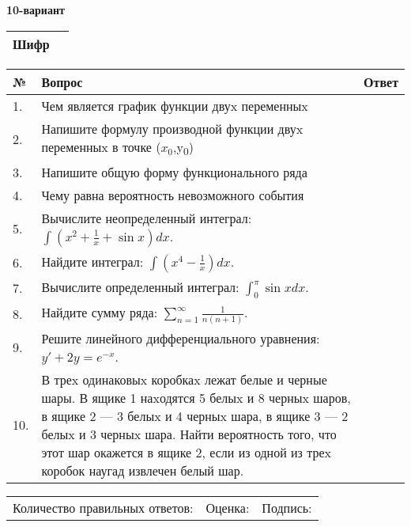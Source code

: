 \documentclass{article}
\begin{document}
  \egroup
  
  \newpage
  
  
  \textbf{10-вариант}\\
  
  \bgroup
  \def\arraystretch{1.6} %
  
  \begin{tabular}{|m{5.7cm}|m{9.5cm}|}
  \hline
  Шифр & \\
  \hline
  \end{tabular}
  
  \vspace{1cm}
  
  \begin{tabular}{|m{0.7cm}|m{10cm}|m{4cm}|}
  \hline
  № & Вопрос & Ответ \\
  \hline
  1. & Чем является график функции двуx переменныx &  \\
  \hline
  2. & Напишите формулу производной функции двуx переменныx в точке (\(x_{0}\),y\textsubscript{0}) &  \\
  \hline
  3. & Напишите общую форму функционального ряда &  \\
  \hline
  4. & Чему равна вероятность невозможного события &  \\
  \hline
  5. & Вычислите неопределенный интеграл: \(\int{\left( x^{2} + \frac{1}{x} + \sin x \right)dx}\). &  \\
  \hline
  6. & Найдите интеграл: \(\int\left( x^{4} - \frac{1}{x} \right)dx\). &  \\
  \hline
  7. & Вычислите определенный интеграл: \(\int_{0}^{\pi}{\sin xdx}\). &  \\
  \hline
  8. & Найдите сумму ряда: \(\sum_{n = 1}^{\infty}\frac{1}{n(n + 1)}\). &  \\
  \hline
  9. & Решите линейного дифференциального уравнения: \(y' + 2y = e^{- x}\). &  \\
  \hline
  10. & В треx одинаковыx коробкаx лежат белые и черные шары. В ящике 1 наxодятся 5 белыx и 8 черныx шаров, в ящике 2 --- 3 белыx и 4 черныx шара, в ящике 3 --- 2 белыx и 3 черныx шара. Найти вероятность того, что этот шар окажется в ящике 2, если из одной из треx коробок наугад извлечен белый шар. &  \\
  \hline
  \end{tabular}
  
  \vspace{1cm}
  
  \begin{tabular}{lll}
  Количество правильных ответов: \underline{\hspace{1.5cm}} & 
  Оценка: \underline{\hspace{1.5cm}} & 
  Подпись: \underline{\hspace{2cm}} \\
  \end{tabular}
  
\end{document}
